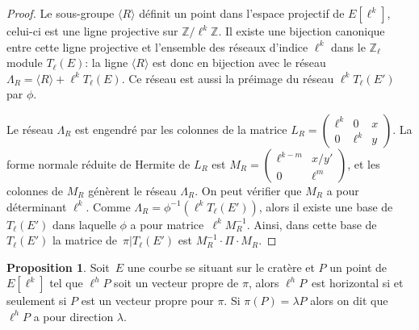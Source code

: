\documentclass[10pt,a4paper]{book}
\theoremstyle{plain}
\theoremstyle{definition}
\theoremstyle{definition}
\theoremstyle{definition}
\newtheorem{prop}[thm]{Proposition}
\theoremstyle{definition}
\theoremstyle{remark}
\theoremstyle{remark}
\theoremstyle{definition}
\begin{document}
\begin{proof}
Le sous-groupe $\langle R \rangle$ définit un point dans l'espace projectif de $E[\ell^k]$,
celui-ci est une ligne projective sur $\mathbb{Z}/\ell^k \mathbb{Z}$. Il existe 
une bijection canonique~\cite[II.1.1]{Serre77} entre cette ligne projective et 
l'ensemble des réseaux d'indice $\ell^k$ dans le $\mathbb{Z}_{\ell}$ module $T_{\ell}(E)$:
la ligne $\langle R \rangle$ est donc en bijection avec le réseau~$\Lambda_R = 
\langle R \rangle + \ell^k T_{\ell}(E)$. Ce réseau est aussi la préimage du réseau 
$\ell^kT_{\ell}(E')$ par $\phi$.

Le réseau $\Lambda_R$ est engendré par les colonnes de la matrice 
$L_R = \left (\begin{smallmatrix}\ell^k & 0 & x\\0 & \ell^k & y\end{smallmatrix} \right )$.
La forme normale réduite de Hermite de $L_R$ est 
$M_R = \left (\begin{smallmatrix}\ell^{k-m} & x/y' \\ 0 & \ell^m\end{smallmatrix}\right )$,
et les colonnes de $M_R$ génèrent le réseau $\Lambda_R$.
On peut vérifier que $M_R$ a pour déterminant $\ell^k$.
Comme $\Lambda_R = \phi^{-1} (\ell^k T_{\ell} (E'))$,
alors il existe une base de~$T_{\ell}(E')$
dans laquelle $\phi$ a pour matrice~$\ell^k M_R^{-1}$.
Ainsi, dans cette base de ~$T_{\ell}(E')$
la matrice de~$\pi|T_{\ell}(E')$ est $M_R^{-1} \cdot \Pi \cdot M_R^{}$.
\end{proof}



\begin{prop} \label{pro:dia:hor}
Soit~$E$ une courbe se situant sur le cratère et $P$ un point de $E[\ell^k]$
tel que $\ell^h P$ soit un vecteur propre de $\pi$, 
alors $\ell^hP$~est horizontal si et seulement si $P$ est un vecteur propre pour $\pi$.
Si $\pi(P)=\lambda P$ alors on dit que $\ell^h P$ a pour direction $\lambda$.
\end{prop}
\end{document}
